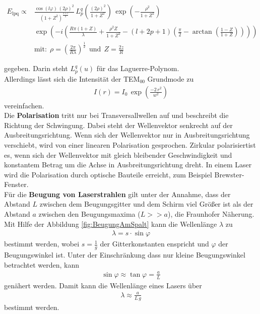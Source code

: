 \begin{align*}
	E_\text{lpq} \propto &\frac{\cos(l\varphi)\,(2\rho)^2}{(1+Z^2)^\frac{1+l}{2}}\, L_p^q\left(\frac{(2\rho)^2}{1+Z^2}\right)\,\exp \left(-\frac{\rho^2}{1+Z^2} \right) \\
	&\exp \left(-i\left(\frac{R\pi(1+Z)}{\lambda}+ \frac{\rho^2Z}{1+Z^2}- (l+2p+1)\left(\frac{\pi}{2}-\arctan \left(\frac{1-Z}{1+Z} \right) \right)\right)\right) \\
	&\text{mit:}\ \ \rho = \left(\frac{2\pi}{R\lambda} \right)^\frac{1}{2} \ \ \text{und} \ \ Z = \frac{2z}{R}
\end{align*}

gegeben. Darin steht $L_p^q(u)$ für das Laguerre-Polynom. \\
Allerdings lässt sich die Intensität der TEM$_{00}$ Grundmode zu
\begin{align}
	I(r) = I_0\,\exp \left(\frac{-2\,r^2}{w^2} \right)
	\label{eqn:Grund}
\end{align}
vereinfachen. \\
Die \textbf{Polarisation} tritt nur bei Transversallwellen auf und beschreibt die Richtung der Schwingung. Dabei steht der Wellenvektor senkrecht auf der Ausbreitungsrichtung. Wenn sich der Wellenvektor nur in Ausbreitungsrichtung verschiebt, wird von einer linearen Polarisation gesprochen. Zirkular polarisiertist es, wenn sich der Wellenvektor mit gleich bleibender Geschwindigkeit und konstantem Betrag um die Achse in Ausbreitungsrichtung dreht. In einem Laser wird die Polarisation durch optische Bauteile erreicht, zum Beispiel Brewster-Fenster. \\
Für die \textbf{Beugung von Laserstrahlen} gilt unter der Annahme, dass der Abstand $L$ zwischen dem Beugungsgitter und dem Schirm viel Größer ist als der Abstand $a$ zwischen den Beugungsmaxima ($L >> a$), die Fraunhofer Näherung. Mit Hilfe der Abbildung \eqref{fig:BeugungAmSpalt} kann die Wellenlänge $\lambda$ zu
\begin{align}
	\lambda = s\cdot\sin\varphi
	\label{eqn:lambda}
\end{align}
bestimmt werden, wobei $s = \frac{1}{g}$ der Gitterkonstanten enspricht und $\varphi$ der Beugungswinkel ist. Unter der Einschränkung dass nur kleine Beugungswinkel betrachtet werden, kann
\begin{align}
	\sin\varphi \approx \tan\varphi = \frac{a}{L}
\end{align}
genähert werden. Damit kann die Wellenlänge eines Lasers über
\begin{align}
	\lambda \approx \frac{a}{L\,g}
	\label{eqn:lambda}
\end{align}
bestimmt werden.

